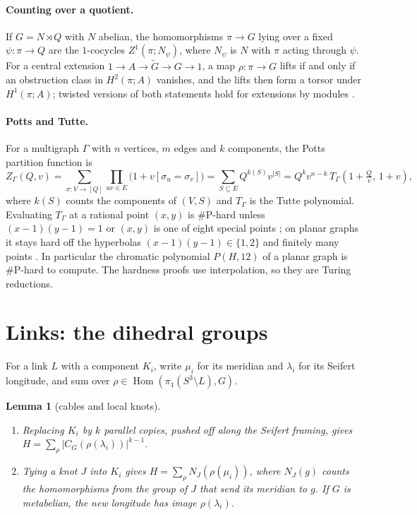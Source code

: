 \documentclass[11pt]{article}
\newtheorem{lemma}[theorem]{Lemma}
\theoremstyle{definition}
\theoremstyle{remark}
\newcommand{\Hom}{\operatorname{Hom}}
\newcommand{\sharpP}{\#\mathrm{P}}
\begin{document}
\paragraph{Counting over a quotient.} If $G=N\rtimes Q$ with $N$ abelian, the
homomorphisms $\pi\to G$ lying over a fixed $\psi\colon\pi\to Q$ are the
$1$-cocycles $Z^1(\pi;N_\psi)$, where $N_\psi$ is $N$ with $\pi$ acting through
$\psi$. For a central extension $1\to A\to\tilde G\to G\to1$, a map
$\rho\colon\pi\to G$ lifts if and only if an obstruction class in
$H^2(\pi;A)$ vanishes, and the lifts then form a torsor under $H^1(\pi;A)$;
twisted versions of both statements hold for extensions by modules
\cite{MS05}.

\paragraph{Potts and Tutte.} For a multigraph $\Gamma$ with $n$ vertices, $m$
edges and $k$ components, the Potts partition function is
\[
Z_\Gamma(Q,v)=\sum_{\sigma\colon V\to[Q]}\prod_{uv\in E}\bigl(1+v[\sigma_u=\sigma_v]\bigr)
=\sum_{S\subseteq E}Q^{k(S)}v^{|S|}=Q^kv^{n-k}\,T_\Gamma\!\left(1+\tfrac Qv,\,1+v\right),
\]
where $k(S)$ counts the components of $(V,S)$ and $T_\Gamma$ is the Tutte
polynomial. Evaluating $T_\Gamma$ at a rational point $(x,y)$ is
$\sharpP$-hard unless $(x-1)(y-1)=1$ or $(x,y)$ is one of eight special
points \cite{JVW90}; on planar graphs it stays hard off the hyperbolas
$(x-1)(y-1)\in\{1,2\}$ and finitely many points \cite{Ver05}. In particular the
chromatic polynomial $P(H,12)$ of a planar graph is $\sharpP$-hard to compute.
The hardness proofs use interpolation, so they are Turing reductions.

\section{Links: the dihedral groups}\label{sec:links}

For a link $L$ with a component $K_i$, write $\mu_i$ for its meridian and
$\lambda_i$ for its Seifert longitude, and sum over
$\rho\in\Hom(\pi_1(S^3\setminus L),G)$.

\begin{lemma}[cables and local knots]\label{lem:cable}
\begin{enumerate}
\item Replacing $K_i$ by $k$ parallel copies, pushed off along the Seifert
framing, gives $H=\sum_\rho|C_G(\rho(\lambda_i))|^{k-1}$.
\item Tying a knot $J$ into $K_i$ gives $H=\sum_\rho N_J(\rho(\mu_i))$, where
$N_J(g)$ counts the homomorphisms from the group of $J$ that send its meridian
to $g$. If $G$ is metabelian, the new longitude has image $\rho(\lambda_i)$.
\end{enumerate}
\end{lemma}
\end{document}
